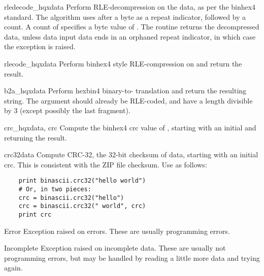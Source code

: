 \begin{funcdesc}{rledecode_hqx}{data}
Perform RLE-decompression on the data, as per the binhex4
standard. The algorithm uses  after a byte as a repeat
indicator, followed by a count. A count of  specifies a byte
value of . The routine returns the decompressed data,
unless data input data ends in an orphaned repeat indicator, in which
case the  exception is raised.
\end{funcdesc}

\begin{funcdesc}{rlecode_hqx}{data}
Perform binhex4 style RLE-compression on  and return the
result.
\end{funcdesc}

\begin{funcdesc}{b2a_hqx}{data}
Perform hexbin4 binary-to-\ASCII{} translation and return the
resulting string. The argument should already be RLE-coded, and have a
length divisible by 3 (except possibly the last fragment).
\end{funcdesc}

\begin{funcdesc}{crc_hqx}{data, crc}
Compute the binhex4 crc value of , starting with an initial
 and returning the result.
\end{funcdesc}

\begin{funcdesc}{crc32}{data}
Compute CRC-32, the 32-bit checksum of data, starting with an initial
crc.  This is consistent with the ZIP file checksum.  Use as follows:
\begin{verbatim}
    print binascii.crc32("hello world")
    # Or, in two pieces:
    crc = binascii.crc32("hello")
    crc = binascii.crc32(" world", crc)
    print crc
\end{verbatim}
\end{funcdesc}
 
\begin{excdesc}{Error}
Exception raised on errors. These are usually programming errors.
\end{excdesc}

\begin{excdesc}{Incomplete}
Exception raised on incomplete data. These are usually not programming
errors, but may be handled by reading a little more data and trying
again.
\end{excdesc}


\begin{seealso}


\end{seealso}
